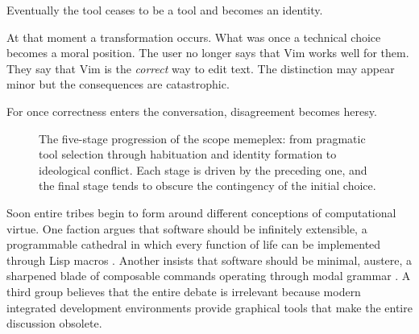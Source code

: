 \documentclass[11pt]{article}
\theoremstyle{definition}
\begin{document}
Eventually the tool ceases to be a tool and becomes an identity.

At that moment a transformation occurs. What was once a technical choice
becomes a moral position. The user no longer says that Vim works well
for them. They say that Vim is the \emph{correct} way to edit text. The
distinction may appear minor but the consequences are catastrophic.

For once correctness enters the conversation, disagreement becomes heresy.

\begin{figure}[h]
\centering
{}
\caption{The five-stage progression of the scope memeplex: from pragmatic
tool selection through habituation and identity formation to ideological
conflict. Each stage is driven by the preceding one, and the final stage
tends to obscure the contingency of the initial choice.}
\label{fig:memeplex_stages}
\end{figure}

Soon entire tribes begin to form around different conceptions of
computational virtue. One faction argues that software should be
infinitely extensible, a programmable cathedral in which every function
of life can be implemented through Lisp macros \cite{stallman2002}.
Another insists that software should be minimal, austere, a sharpened
blade of composable commands operating through modal grammar
\cite{mcilroy1978}. A third group believes that the entire debate is
irrelevant because modern integrated development environments provide
graphical tools that make the entire discussion obsolete.
\end{document}
